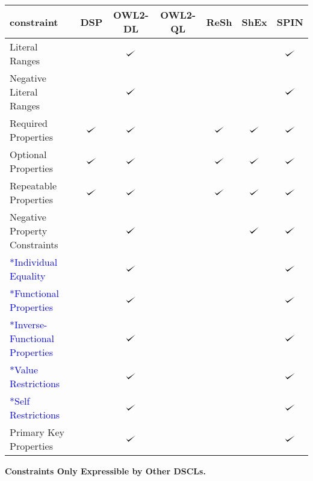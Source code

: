 \documentclass{llncs}
\def\checkmark{\tikz\fill[scale=0.4](0,.35) -- (.25,0) -- (1,.7) -- (.25,.15) -- cycle;}
\newenvironment{evaluation}{
  \scriptsize
  \sffamily
  \vspace{0.3cm}
  \begin{tabular}{l|c|c|c|c|c|c}
  \hline
  \textbf{constraint} & \textbf{DSP} & \textbf{OWL2-DL} & \textbf{OWL2-QL} & \textbf{ReSh} & \textbf{ShEx} & \textbf{SPIN} \\
  \hline

}{
  \hline
  \end{tabular}
  \linebreak
}
\begin{document}
\begin{evaluation}
Literal Ranges & \ding{55} & $\checkmark$ & \ding{55} & \ding{55} & \ding{55} & $\checkmark$ \\
Negative Literal Ranges & \ding{55} & $\checkmark$ & \ding{55} & \ding{55} & \ding{55} & $\checkmark$ \\
Required Properties & $\checkmark$ & $\checkmark$ & \ding{55} & $\checkmark$ & $\checkmark$ & $\checkmark$ \\
Optional Properties & $\checkmark$ & $\checkmark$ & \ding{55} & $\checkmark$ & $\checkmark$ & $\checkmark$ \\
Repeatable Properties & $\checkmark$ & $\checkmark$ & \ding{55} & $\checkmark$ & $\checkmark$ & $\checkmark$ \\
Negative Property Constraints & \ding{55} & $\checkmark$ & \ding{55} & & $\checkmark$ & $\checkmark$ \\
\textcolor{blue}{*Individual Equality} & \ding{55} & $\checkmark$ & \ding{55} & \ding{55} & \ding{55} & $\checkmark$ \\
\textcolor{blue}{*Functional Properties} & \ding{55} & $\checkmark$ & \ding{55} & \ding{55} & \ding{55} & $\checkmark$ \\
\textcolor{blue}{*Inverse-Functional Properties} & \ding{55} & $\checkmark$ & \ding{55} & \ding{55} & \ding{55} & $\checkmark$ \\
\textcolor{blue}{*Value Restrictions} & & $\checkmark$ & \ding{55} & & & $\checkmark$ \\
\textcolor{blue}{*Self Restrictions} & \ding{55} & $\checkmark$ & \ding{55} & \ding{55} & \ding{55} & $\checkmark$ \\
Primary Key Properties & \ding{55} & $\checkmark$ & \ding{55} & \ding{55} & \ding{55} & $\checkmark$ \\
\end{evaluation}

\textbf{Constraints Only Expressible by Other DSCLs.}
\end{document}
